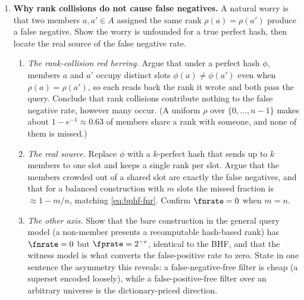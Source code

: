 \begin{enumerate}
\item \exstarstarstar
\label{ex:ch15-9}
\textbf{Why rank collisions do not cause false negatives.}
A natural worry is that two members $a, a' \in A$ assigned the same
rank $\rho(a) = \rho(a')$ produce a false negative. Show the worry is
unfounded for a true perfect hash, then locate the real source of the
false negative rate.
\begin{enumerate}
  \item[(a)] \emph{The rank-collision red herring.} Argue that under
    a perfect hash $\phi$, members $a$ and $a'$ occupy distinct slots
    $\phi(a) \ne \phi(a')$ even when $\rho(a) = \rho(a')$, so each
    reads back the rank it wrote and both pass the query. Conclude
    that rank collisions contribute nothing to the false negative
    rate, however many occur. (A uniform $\rho$ over
    $\{0, \ldots, n - 1\}$ makes about $1 - e^{-1} \approx 0.63$ of
    members share a rank with someone, and none of them is missed.)
  \item[(b)] \emph{The real source.} Replace $\phi$ with a
    $k$-perfect hash that sends up to $k$ members to one slot and
    keeps a single rank per slot. Argue that the members crowded out
    of a shared slot are exactly the false negatives, and that for a
    balanced construction with $m$ slots the missed fraction is
    $\approx 1 - m/n$, matching \eqref{eq:bphf-fnr}. Confirm
    $\fnrate = 0$ when $m = n$.
  \item[(c)] \emph{The other axis.} Show that the bare construction
    in the general query model (a non-member presents a recomputable
    hash-based rank) has $\fnrate = 0$ but $\fprate = 2^{-r}$,
    identical to the BHF, and that the witness model is what converts
    the false-positive rate to zero. State in one sentence the
    asymmetry this reveals: a false-negative-free filter is cheap (a
    superset encoded loosely), while a false-positive-free filter
    over an arbitrary universe is the dictionary-priced direction.
\end{enumerate}


\end{enumerate}
